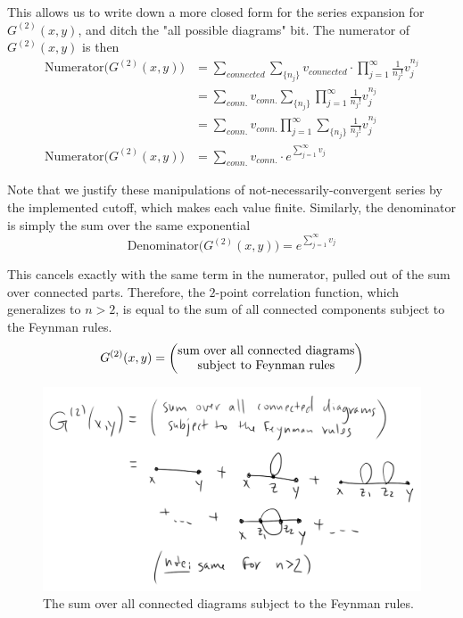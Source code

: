 \noindent This allows us to write down a more closed form for the series expansion for $G^{(2)}(x,y)$, and ditch the "all possible diagrams" bit. The numerator of $G^{(2)}(x,y)$ is then
\begin{align}
\text{Numerator(}G^{(2)}(x,y)\text{)} &= \sum_{connected} \sum_{\{n_j\}} v_{connected} \cdot \prod_{j=1}^\infty \frac{1}{n_j !} v_j^{n_j} \\
&= \sum_{conn.} v_{conn.} \sum_{\{n_j\}} \prod_{j=1}^\infty \frac{1}{n_j !} v_j^{n_j} \\
&= \sum_{conn.} v_{conn.} \prod_{j=1}^\infty \sum_{\{n_j\}} \frac{1}{n_j !} v_j^{n_j}  \\
\text{Numerator(}G^{(2)}(x,y)\text{)} &= \sum_{conn.} v_{conn.} \cdot e^{\sum_{j=1}^{\infty} v_j}
\end{align}

\noindent Note that we justify these manipulations of not-necessarily-convergent series by the implemented cutoff, which makes each value finite. Similarly, the denominator is simply the sum over the same exponential
\begin{equation}
\text{Denominator(}G^{(2)}(x,y)\text{)} = e^{\sum_{j=1}^{\infty} v_j}
\end{equation}

\noindent This cancels exactly with the same term in the numerator, pulled out of the sum over connected parts. Therefore, the $2$-point correlation function, which generalizes to $n>2$, is equal to the sum of all connected components subject to the Feynman rules.
\begin{equation}
G^{(2)}(x,y) = \left(\stackanchor{sum over all connected diagrams}{subject to Feynman rules}\right)
\end{equation}

\begin{figure}[H]
	\centering
	\includegraphics[scale=0.6]{allconnected.png}
	\caption{The sum over all connected diagrams subject to the Feynman rules.}
\end{figure}

